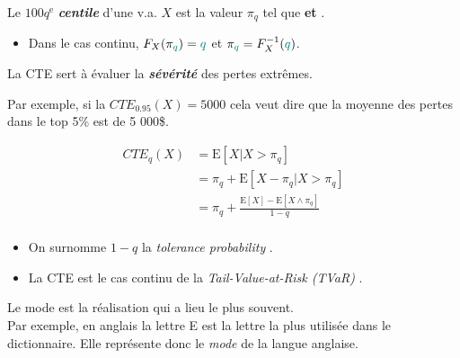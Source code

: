 \documentclass[french]{article}
\begin{document}
\begin{multicols*}{2}
\begin{definitionNOHFILL}[Centile]
Le $100q^{\text{e}}$ \textbf{\textit{centile}} d'une v.a. $X$ est la valeur $\pi_{q}$ tel que  \textbf{et} .

\bigskip

\begin{itemize}
	\item	Dans le cas continu, $F_{X}(\pi_{\textcolor{teal}{q}})	=	\textcolor{teal}{q}$ et $\pi_{\textcolor{teal}{q}}	=	F^{-1}_{X}(\textcolor{teal}{q})$.
\end{itemize}
\end{definitionNOHFILL}

\begin{definitionNOHFILL}
\begin{rappel_enhanced}[Contexte]
La CTE sert à évaluer la \textit{\textbf{sévérité}} des pertes extrêmes. 

\bigskip

Par exemple, si la $CTE_{0.95}(X)	=	5000$ cela veut dire que la moyenne des pertes dans le top 5\% est de 5 000\$.
\end{rappel_enhanced}

\begin{align*}
	CTE_{q}(X)
	&=	\text{E}[X | X > \pi_{q}]	\\
	&=	\pi_{q} + \text{E}[X - \pi_{q} | X > \pi_{q}]		\\
	&=	\pi_{q} + \frac{\text{E}[X]	- \text{E}[X \wedge \pi_{q}]	}{1 - q}	\\
\end{align*}

\begin{itemize}
	\item	On surnomme $1	-	q$ la \og \textit{tolerance probability} \fg{}.
	\item	La CTE est le cas continu de la \og \textit{Tail-Value-at-Risk (TVaR)} \fg{}.
\end{itemize}
\end{definitionNOHFILL}


\begin{definitionNOHFILL}[Mode]
\begin{rappel_enhanced}[Contexte]
Le mode est la réalisation qui a lieu le plus souvent. \\
Par exemple, en anglais la lettre E est la lettre la plus utilisée dans le dictionnaire. Elle représente donc le \textit{mode} de la langue anglaise.
\end{rappel_enhanced}


\end{definitionNOHFILL}
\end{multicols*}
\end{document}
